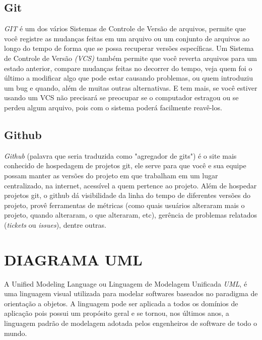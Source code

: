 \section{Git}
\textit{GIT} é um dos vários Sistemas de Controle de Versão de arquivos, permite que você registre as mudanças feitas em um arquivo ou um conjunto de arquivos ao longo do tempo de forma que se possa recuperar versões específicas. Um Sistema de Controle de Versão \textit{(VCS)} também permite que você reverta arquivos para um estado anterior, compare mudanças feitas no decorrer do tempo, veja quem foi o último a modificar algo que pode estar causando problemas, ou quem introduziu um bug e quando, além de muitas outras alternativas. E tem mais, se você estiver usando um VCS não precisará se preocupar se o computador estragou ou se perdeu algum arquivo, pois com o sistema poderá facilmente reavê-los. \cite{git}

\section{Github}
\textit{Github} (palavra que seria traduzida como "agregador de gits") é o site mais conhecido de hospedagem de projetos git, ele serve para que você e sua equipe possam manter as versões do projeto em que trabalham em um lugar centralizado, na internet, acessível a quem pertence ao projeto. Além de hospedar projetos git, o github dá visibilidade da linha do tempo de diferentes versões do projeto, provê ferramentas de métricas (como quais usuários alteraram mais o projeto, quando alteraram, o que alteraram, etc), gerência de problemas relatados (\textit{tickets} ou \textit{issues}), dentre outras. \cite{github}



\chapter{DIAGRAMA UML}
\label{chap:diauml}
A Unified Modeling Language ou Linguagem de Modelagem Unificada \textit{UML}, é uma linguagem visual utilizada para modelar softwares baseados no paradigma de orientação a objetos. A linguagem pode ser aplicada a todos os domínios de aplicação pois possui um propósito geral e se tornou, nos últimos anos, a linguagem padrão de modelagem adotada pelos engenheiros de software de todo o mundo. \cite{Guedes}

